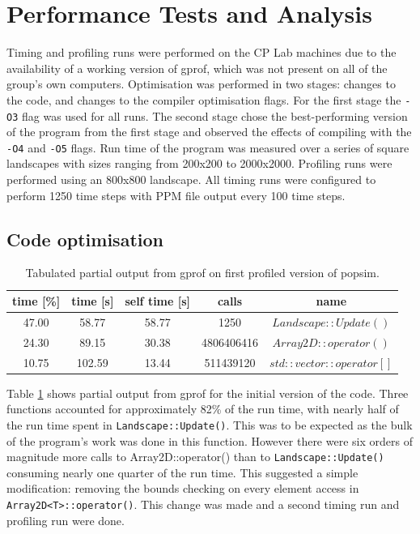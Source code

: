 \section{Performance Tests and Analysis}
\label{Performance Tests and Analysis}

Timing and profiling runs were performed on the CP Lab machines due to the availability of a working version of gprof, which was not present on all of the group's own computers.
Optimisation was performed in two stages: changes to the code, and changes to the compiler optimisation flags.  For the first stage the \texttt{-O3} flag was used for all runs.  The second stage chose the best-performing version of the program from the first stage and observed the effects of compiling with the \texttt{-O4} and \texttt{-O5} flags.
Run time of the program was measured over a series of square landscapes with sizes ranging from 200x200 to 2000x2000.
Profiling runs were performed using an 800x800 landscape.
All timing runs were configured to perform 1250 time steps with PPM file output every 100 time steps.


\subsection{Code optimisation}
\label{Code optimisation}

\begin{table}[h!]
\caption{Tabulated partial output from gprof on first profiled version of popsim.}
\label{tab:profile1}
\begin{center}
\begin{tabular}{|c|c|c|c|c|}
\hline
time [\%] & time [s] & self time [s] & calls & name\\
\hline
47.00 & 58.77 & 58.77 & 1250 & $Landscape::Update()$\\
\hline
24.30 & 89.15 & 30.38& 4806406416 & $Array2D::operator()$\\
\hline
10.75& 102.59 & 13.44 & 511439120 & $std::vector::operator[]$\\
\hline
\end{tabular}
\end{center}
\end{table}

Table \ref{tab:profile1} shows partial output from gprof for the initial version of the code.
Three functions accounted for approximately 82\% of the run time, with nearly half of the run time spent in \texttt{Landscape::Update()}.
This was to be expected as the bulk of the program's work was done in this function.
However there were six orders of magnitude more calls to Array2D::operator() than to \texttt{Landscape::Update()} consuming nearly one quarter of the run time.  This suggested a simple modification: removing the bounds checking on every element access in \texttt{Array2D<T>::operator()}.
This change was made and a second timing run and profiling run were done.

